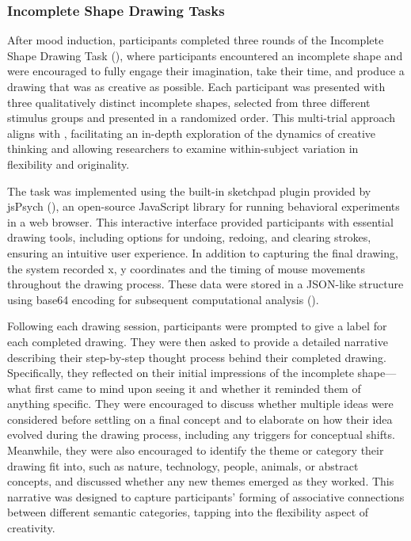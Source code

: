 \documentclass[../MA_Thesis.tex]{subfiles}
\begin{document}
\subsubsection*{Incomplete Shape Drawing Tasks}
After mood induction, participants completed three rounds of the Incomplete Shape Drawing Task (\cite{barbot_dynamics_2018}), where participants encountered an incomplete shape and were encouraged to fully engage their imagination, take their time, and produce a drawing that was as creative as possible. Each participant was presented with three qualitatively distinct incomplete shapes, selected from three different stimulus groups and presented in a randomized order. This multi-trial approach aligns with \textcite{barbot_dynamics_2018}, facilitating an in-depth exploration of the dynamics of creative thinking and allowing researchers to examine within-subject variation in flexibility and originality. 

The task was implemented using the built-in sketchpad plugin provided by jsPsych (\cite{leeuw_jspsych_2023}), an open-source JavaScript library for running behavioral experiments in a web browser. This interactive interface provided participants with essential drawing tools, including options for undoing, redoing, and clearing strokes, ensuring an intuitive user experience. In addition to capturing the final drawing, the system recorded x, y coordinates and the timing of mouse movements throughout the drawing process. These data were stored in a JSON-like structure using base64 encoding for subsequent computational analysis (\cite{bainbridge_tutorial_2022}).

Following each drawing session, participants were prompted to give a label for each completed drawing. They were then asked to provide a detailed narrative describing their step-by-step thought process behind their completed drawing. Specifically, they reflected on their initial impressions of the incomplete shape—what first came to mind upon seeing it and whether it reminded them of anything specific. They were encouraged to discuss whether multiple ideas were considered before settling on a final concept and to elaborate on how their idea evolved during the drawing process, including any triggers for conceptual shifts. Meanwhile, they were also encouraged to identify the theme or category their drawing fit into, such as nature, technology, people, animals, or abstract concepts, and discussed whether any new themes emerged as they worked. This narrative was designed to capture participants' forming of associative connections between different semantic categories, tapping into the flexibility aspect of creativity. 
\end{document}
